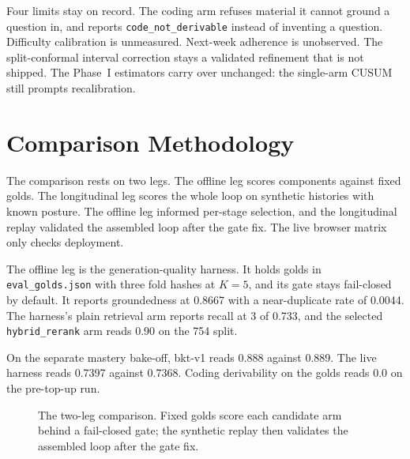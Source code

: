 Four limits stay on record. The coding arm refuses material it cannot ground a question in, and reports \texttt{code\_not\_derivable} instead of inventing a question. Difficulty calibration is unmeasured. Next-week adherence is unobserved. The split-conformal interval correction stays a validated refinement that is not shipped. The Phase~I estimators carry over unchanged: the single-arm CUSUM still prompts recalibration.

\section{Comparison Methodology}
The comparison rests on two legs. The offline leg scores components against fixed golds. The longitudinal leg scores the whole loop on synthetic histories with known posture. The offline leg informed per-stage selection, and the longitudinal replay validated the assembled loop after the gate fix. The live browser matrix only checks deployment.

The offline leg is the generation-quality harness. It holds golds in \texttt{eval\_golds.json} with three fold hashes at $K=5$, and its gate stays fail-closed by default. It reports groundedness at 0.8667 with a near-duplicate rate of 0.0044. The harness's plain retrieval arm reports recall at 3 of 0.733, and the selected \texttt{hybrid\_rerank} arm reads 0.90 on the 754 split.

On the separate mastery bake-off, bkt-v1 reads 0.888 against 0.889. The live harness reads 0.7397 against 0.7368. Coding derivability on the golds reads 0.0 on the pre-top-up run.

\begin{figure}[htbp]
\centering
{}
\caption{The two-leg comparison. Fixed golds score each candidate arm behind a fail-closed gate; the synthetic replay then validates the assembled loop after the gate fix.}
\label{fig:comparison-pipeline}
\end{figure}

